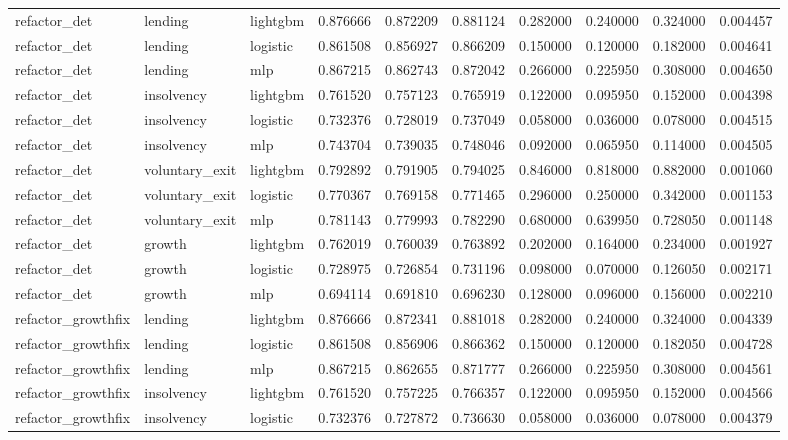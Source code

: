 \begin{table}
{\begin{tabular}{lllrrrrrrr}
refactor_det & lending & lightgbm & 0.876666 & 0.872209 & 0.881124 & 0.282000 & 0.240000 & 0.324000 & 0.004457 \\
refactor_det & lending & logistic & 0.861508 & 0.856927 & 0.866209 & 0.150000 & 0.120000 & 0.182000 & 0.004641 \\
refactor_det & lending & mlp & 0.867215 & 0.862743 & 0.872042 & 0.266000 & 0.225950 & 0.308000 & 0.004650 \\
refactor_det & insolvency & lightgbm & 0.761520 & 0.757123 & 0.765919 & 0.122000 & 0.095950 & 0.152000 & 0.004398 \\
refactor_det & insolvency & logistic & 0.732376 & 0.728019 & 0.737049 & 0.058000 & 0.036000 & 0.078000 & 0.004515 \\
refactor_det & insolvency & mlp & 0.743704 & 0.739035 & 0.748046 & 0.092000 & 0.065950 & 0.114000 & 0.004505 \\
refactor_det & voluntary_exit & lightgbm & 0.792892 & 0.791905 & 0.794025 & 0.846000 & 0.818000 & 0.882000 & 0.001060 \\
refactor_det & voluntary_exit & logistic & 0.770367 & 0.769158 & 0.771465 & 0.296000 & 0.250000 & 0.342000 & 0.001153 \\
refactor_det & voluntary_exit & mlp & 0.781143 & 0.779993 & 0.782290 & 0.680000 & 0.639950 & 0.728050 & 0.001148 \\
refactor_det & growth & lightgbm & 0.762019 & 0.760039 & 0.763892 & 0.202000 & 0.164000 & 0.234000 & 0.001927 \\
refactor_det & growth & logistic & 0.728975 & 0.726854 & 0.731196 & 0.098000 & 0.070000 & 0.126050 & 0.002171 \\
refactor_det & growth & mlp & 0.694114 & 0.691810 & 0.696230 & 0.128000 & 0.096000 & 0.156000 & 0.002210 \\
refactor_growthfix & lending & lightgbm & 0.876666 & 0.872341 & 0.881018 & 0.282000 & 0.240000 & 0.324000 & 0.004339 \\
refactor_growthfix & lending & logistic & 0.861508 & 0.856906 & 0.866362 & 0.150000 & 0.120000 & 0.182050 & 0.004728 \\
refactor_growthfix & lending & mlp & 0.867215 & 0.862655 & 0.871777 & 0.266000 & 0.225950 & 0.308000 & 0.004561 \\
refactor_growthfix & insolvency & lightgbm & 0.761520 & 0.757225 & 0.766357 & 0.122000 & 0.095950 & 0.152000 & 0.004566 \\
refactor_growthfix & insolvency & logistic & 0.732376 & 0.727872 & 0.736630 & 0.058000 & 0.036000 & 0.078000 & 0.004379 \\

\end{tabular}}
\end{table}
